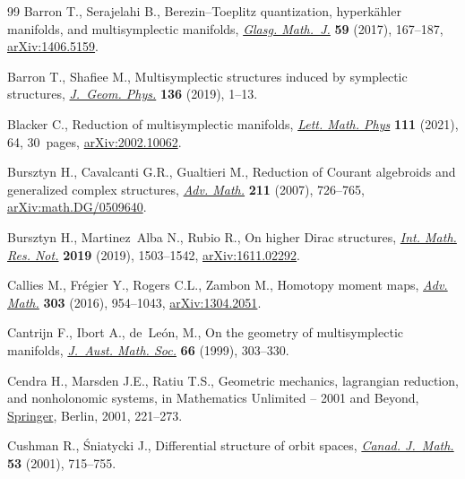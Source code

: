 \documentclass[10pt,a4paper]{amsart}
\numberwithin{equation}{section}
\begin{document}
\begin{thebibliography}{99}
Barron T., Serajelahi B., Berezin--{T}oeplitz quantization, hyperk\"ahler
  manifolds, and multisymplectic manifolds, \href{https://doi.org/10.1017/S0017089516000100}{\textit{Glasg. Math.~J.}}
  \textbf{59} (2017), 167--187, \href{https://arxiv.org/abs/1406.5159}{arXiv:1406.5159}.

Barron T., Shafiee M., Multisymplectic structures induced by symplectic
  structures, \href{https://doi.org/10.1016/j.geomphys.2018.10.008}{\textit{J.~Geom. Phys.}} \textbf{136} (2019), 1--13.

Blacker C., Reduction of multisymplectic manifolds, \href{https://doi.org/10.1007/s11005-021-01408-y}{\textit{Lett. Math. Phys}}
  \textbf{111} (2021), 64, 30~pages, \href{https://arxiv.org/abs/2002.10062}{arXiv:2002.10062}.

Bursztyn H., Cavalcanti G.R., Gualtieri M., Reduction of {C}ourant algebroids
  and generalized complex structures, \href{https://doi.org/10.1016/j.aim.2006.09.008}{\textit{Adv. Math.}} \textbf{211} (2007),
  726--765, \href{https://arxiv.org/abs/math.DG/0509640}{arXiv:math.DG/0509640}.

Bursztyn H., Martinez~Alba N., Rubio R., On higher {D}irac structures,
  \href{https://doi.org/10.1093/imrn/rnx163}{\textit{Int. Math. Res. Not.}} \textbf{2019} (2019), 1503--1542,
  \href{https://arxiv.org/abs/1611.02292}{arXiv:1611.02292}.

Callies M., Fr\'egier Y., Rogers C.L., Zambon M., Homotopy moment maps,
  \href{https://doi.org/10.1016/j.aim.2016.08.012}{\textit{Adv. Math.}} \textbf{303} (2016), 954--1043, \href{https://arxiv.org/abs/1304.2051}{arXiv:1304.2051}.

Cantrijn F., Ibort A., de~Le\'on, M., On the geometry of multisymplectic
  manifolds, \href{https://doi.org/10.1017/S1446788700036636}{\textit{J.~Aust. Math. Soc.}} \textbf{66} (1999), 303--330.

Cendra H., Marsden J.E., Ratiu T.S., Geometric mechanics, lagrangian reduction,
  and nonholonomic systems, in Mathematics Unlimited -- 2001 and Beyond,
  \href{https://doi.org/10.1007/978-3-642-56478-9_10}{Springer}, Berlin, 2001, 221--273.

Cushman R., \'Sniatycki J., Differential structure of orbit spaces,
  \href{https://doi.org/10.4153/CJM-2001-029-1}{\textit{Canad. J.~Math.}} \textbf{53} (2001), 715--755.


\end{thebibliography}
\end{document}
